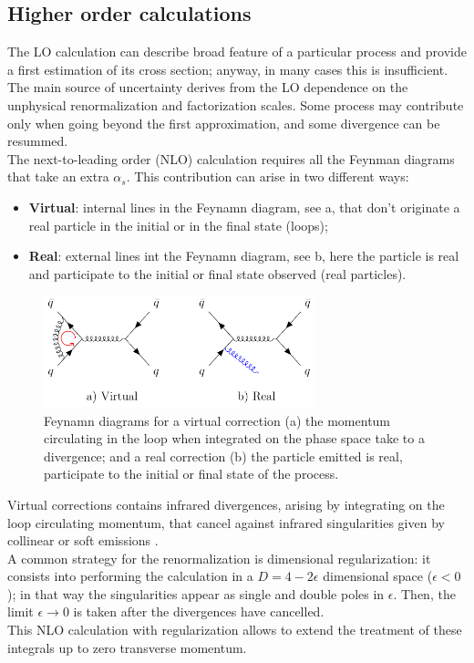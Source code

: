 \subsection{Higher order calculations}

The LO calculation can describe broad feature of a particular process and provide a first estimation of its cross section; anyway, in many cases this is insufficient.
\\
The main source of uncertainty derives from the LO dependence  on the unphysical renormalization and factorization scales. Some process may contribute only when going beyond the first approximation, and some divergence can be resummed. 
\\
The next-to-leading order (NLO) calculation requires all the Feynman diagrams that take an extra $\alpha_s$. This contribution can arise in two different ways:
\begin{itemize}
	\item \textbf{Virtual}: internal lines in the Feynamn diagram, see a, that don't originate a real particle in the initial or in the final state (loops);
	\item \textbf{Real}: external lines int the Feynamn diagram, see b, here the particle is real and participate to the initial or final state observed (real particles).
\end{itemize}
\begin{figure}[!htb]
	\centering
	\includegraphics[width=0.7\textwidth]{img/feynman_Real_Virtual.pdf}
	\caption{Feynamn diagrams for a virtual correction (a) the momentum circulating in the loop when integrated on the phase space take to a divergence; and a real correction (b) the particle emitted is real, participate to the initial or final state of the process.}
	\label{fig:feynman_Real_Virtual}
\end{figure}

Virtual corrections contains infrared divergences, arising by integrating on the loop circulating momentum, that cancel against infrared singularities given by collinear  or soft emissions \cite{PhysRevBloch, KinoshitaToichiro, PhysRevLee}. 
\\
A common strategy for the renormalization is dimensional regularization: it consists into performing the calculation in a $D=4-2\epsilon$ dimensional space ($\epsilon<0$); in that way the singularities appear as single and double poles in $\epsilon$. Then, the limit $\epsilon\rightarrow0$ is taken after the divergences have cancelled.
\\
This NLO calculation with regularization allows to extend the treatment of these integrals up to zero transverse momentum.

